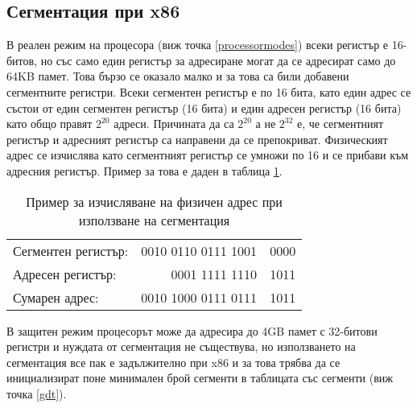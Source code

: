   \subsection{Сегментация при x86} \label{segmentation}
  В реален режим на процесора (виж точка \ref{processormodes}) всеки регистър е 16-битов, но със само един регистър за адресиране могат да се адресират само до 64KB памет. Това бързо се оказало малко и за това са били добавени сегментните регистри. Всеки сегментен регистър е по 16 бита, като един адрес се състои от един сегментен регистър (16 бита) и един адресен регистър (16 бита) като общо правят $2^{20}$ адреси.\cite[глава~2.1.1]{intel-manual-1} Причината да са $2^{20}$ а не $2^{32}$ е, че сегментният регистър и адресният регистър са направени да се препокриват. Физическият адрес се изчислява като сегментният регистър се умножи по 16 и се прибави към адресния регистър. Пример за това е даден в таблица \ref{tab:segmentation-calculation}.
  \begin{table}[htpb]
    \centering
    \begin{tabular}{l r@{\hskip 3pt}l}
      Сегментен регистър: & 0010 0110 0111 1001 & \color{gray}0000 \\
      Адресен регистър: & 0001 1111 1110 & 1011 \\
      \hline
      Сумарен адрес: & 0010 1000 0111 0111 & 1011 \\
    \end{tabular}
    \caption{Пример за изчисляване на физичен адрес при използване на сегментация}
    \label{tab:segmentation-calculation}
  \end{table}

  В защитен режим процесорът може да адресира до 4GB памет с 32-битови регистри и нуждата от сегментация не съществува, но използването на сегментация все пак е задължително при x86 и за това трябва да се инициализират поне минимален брой сегменти в таблицата със сегменти (виж точка \ref{gdt}).


